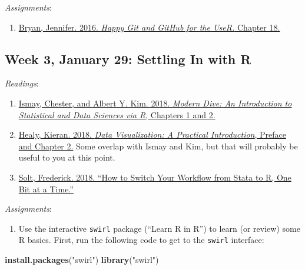 \documentclass[]{article}
\providecommand{\tightlist}{%
  \setlength{\itemsep}{0pt}\setlength{\parskip}{0pt}}
\newenvironment{Shaded}{\begin{snugshade}}{\end{snugshade}}
\newcommand{\KeywordTok}[1]{\textcolor[rgb]{0.13,0.29,0.53}{\textbf{#1}}}
\newcommand{\NormalTok}[1]{#1}
\newcommand{\StringTok}[1]{\textcolor[rgb]{0.31,0.60,0.02}{#1}}
\begin{document}
\emph{Assignments}:

\begin{enumerate}
\def\labelenumi{\arabic{enumi}.}
\tightlist
\item
  \href{https://happygitwithr.com/rmd-test-drive.html}{Bryan, Jennifer.
  2016. \emph{Happy Git and GitHub for the UseR.} Chapter 18.}
\end{enumerate}

\hypertarget{week-3-january-29-settling-in-with}{%
\subsection{\texorpdfstring{Week 3, January 29: Settling In with
\textsf{R}}{Week 3, January 29: Settling In with }}\label{week-3-january-29-settling-in-with}}

\emph{Readings}:

\begin{enumerate}
\def\labelenumi{\arabic{enumi}.}
\tightlist
\item
  \href{https://moderndive.com/index.html}{Ismay, Chester, and Albert Y.
  Kim. 2018. \emph{Modern Dive: An Introduction to Statistical and Data
  Sciences via R}, Chapters 1 and 2.}
\item
  \href{https://socviz.co/}{Healy, Kieran. 2018. \emph{Data
  Visualization: A Practical Introduction}, Preface and Chapter 2.} Some
  overlap with Ismay and Kim, but that will probably be useful to you at
  this point.
\item
  \href{https://fsolt.org/blog/2018/08/15/switch-to-r.html}{Solt,
  Frederick. 2018. ``How to Switch Your Workflow from Stata to R, One
  Bit at a Time.''}
\end{enumerate}

\emph{Assignments}:

\begin{enumerate}
\def\labelenumi{\arabic{enumi}.}
\tightlist
\item
  Use the interactive \texttt{swirl} package (``Learn \textsf{R} in
  \textsf{R}'') to learn (or review) some \textsf{R} basics. First, run
  the following code to get to the \texttt{swirl} interface:
\end{enumerate}

\begin{Shaded}
\begin{Highlighting}[]
\KeywordTok{install.packages}\NormalTok{(}\StringTok{"swirl"}\NormalTok{)}
\KeywordTok{library}\NormalTok{(}\StringTok{"swirl"}\NormalTok{)}
\end{Highlighting}
\end{Shaded}
\end{document}
